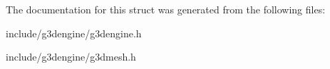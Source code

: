 The documentation for this struct was generated from the following files\+:\begin{DoxyCompactItemize}
\item 
include/g3dengine/g3dengine.\+h\item 
include/g3dengine/g3dmesh.\+h\end{DoxyCompactItemize}

